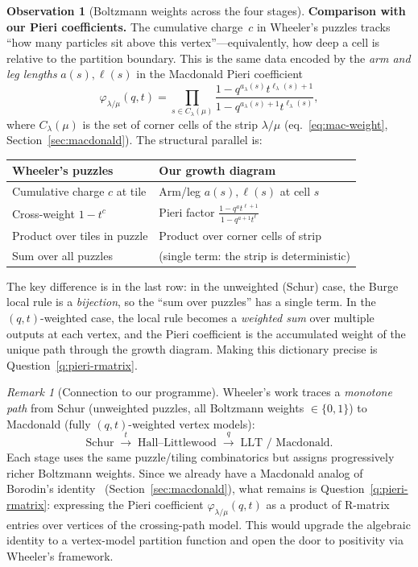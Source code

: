 \documentclass[11pt]{article}
\theoremstyle{plain}
\theoremstyle{definition}
\newtheorem{observation}[theorem]{Observation}
\theoremstyle{remark}
\newtheorem{remark}[theorem]{Remark}
\begin{document}
\begin{enumerate}
\begin{observation}[Boltzmann weights across the four stages]
  \smallskip\noindent\textbf{Comparison with our Pieri coefficients.}
  The cumulative charge~$c$ in Wheeler's puzzles tracks
  ``how many particles sit above this vertex''---equivalently,
  how deep a cell is relative to the partition boundary.
  This is the same data encoded by the \emph{arm and leg
  lengths} $a(s), \ell(s)$ in the Macdonald Pieri coefficient
  \[
    \varphi_{\lambda/\mu}(q,t)
    = \prod_{s \in C_\lambda(\mu)}
    \frac{1 - q^{a_\lambda(s)} t^{\ell_\lambda(s)+1}}
         {1 - q^{a_\lambda(s)+1} t^{\ell_\lambda(s)}},
  \]
  where $C_\lambda(\mu)$ is the set of corner cells of the
  strip $\lambda/\mu$
  (eq.~\eqref{eq:mac-weight}, Section~\ref{sec:macdonald}).
  The structural parallel is:
  \begin{center}
  \renewcommand{\arraystretch}{1.3}
  \begin{tabular}{l|l}
  \textbf{Wheeler's puzzles} & \textbf{Our growth diagram} \\ \hline
  Cumulative charge $c$ at tile
    & Arm/leg $a(s), \ell(s)$ at cell $s$ \\
  Cross-weight $1 - t^c$
    & Pieri factor $\frac{1-q^a t^{\ell+1}}{1-q^{a+1}t^\ell}$ \\
  Product over tiles in puzzle
    & Product over corner cells of strip \\
  Sum over all puzzles
    & (single term: the strip is deterministic)
  \end{tabular}
  \end{center}
  The key difference is in the last row: in the unweighted
  (Schur) case, the Burge local rule is a \emph{bijection},
  so the ``sum over puzzles'' has a single term.  In the
  $(q,t)$-weighted case, the local rule becomes a
  \emph{weighted sum} over multiple outputs at each vertex,
  and the Pieri coefficient is the accumulated weight of
  the unique path through the growth diagram.
  Making this dictionary precise is
  Question~\ref{q:pieri-rmatrix}.
  \end{observation}

  \begin{remark}[Connection to our programme]
  Wheeler's work traces a \emph{monotone path} from Schur
  (unweighted puzzles, all Boltzmann weights $\in \{0,1\}$)
  to Macdonald (fully $(q,t)$-weighted vertex models):
  \[
    \text{Schur} \;\xrightarrow{t}\;
    \text{Hall--Littlewood} \;\xrightarrow{q}\;
    \text{LLT / Macdonald}.
  \]
  Each stage uses the same puzzle/tiling combinatorics
  but assigns progressively richer Boltzmann weights.
  Since we already have a Macdonald analog of
  Borodin's identity~\cite{langer-thesis}
  (Section~\ref{sec:macdonald}), what remains is
  Question~\ref{q:pieri-rmatrix}: expressing the Pieri
  coefficient $\varphi_{\lambda/\mu}(q,t)$ as a product of
  R-matrix entries over vertices of the crossing-path model.
  This would upgrade the algebraic identity to a
  vertex-model partition function and open the door to
  positivity via Wheeler's framework.
  \end{remark}
\end{enumerate}
\end{document}
